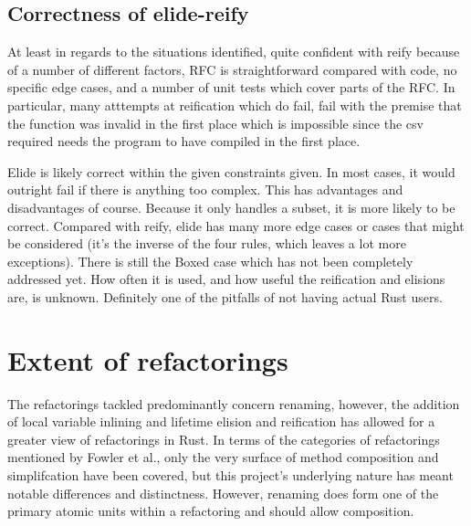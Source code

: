 \subsection{Correctness of elide-reify}

At least in regards to the situations identified, quite confident with reify because of a number of different factors, RFC is straightforward compared with code, no specific edge cases, and a number of unit tests which cover parts of the RFC. In particular, many atttempts at reification which do fail, fail with the premise that the function was invalid in the first place which is impossible since the csv required needs the program to have compiled in the first place. 


Elide is likely correct within the given constraints given. In most cases, it would outright fail if there is anything too complex. This has advantages and disadvantages of course. Because it only handles a subset, it is more likely to be correct. Compared with reify, elide has many more edge cases or cases that might be considered (it's the inverse of the four rules, which leaves a lot more exceptions). There is still the Boxed case which has not been completely addressed yet. How often it is used, and how useful the reification and elisions are, is unknown. Definitely one of the pitfalls of not having actual Rust users. 




\section{Extent of refactorings}

The refactorings tackled predominantly concern renaming, however, the addition of local variable inlining and lifetime elision and reification has allowed for a greater view of refactorings in Rust. In terms of the categories of refactorings mentioned by Fowler et al., only the very surface of method composition and simplifcation have been covered, but this project's underlying nature has meant notable differences and distinctness. However, renaming does form one of the primary atomic units within a refactoring and should allow composition.

